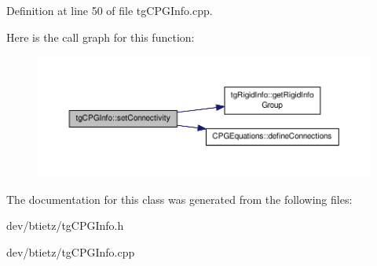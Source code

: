 Definition at line 50 of file tg\-C\-P\-G\-Info.\-cpp.



Here is the call graph for this function\-:\nopagebreak
\begin{figure}[H]
\begin{center}
\leavevmode
\includegraphics[width=350pt]{classtg_c_p_g_info_ae6196de220c88e8631b863e0d63d1d7f_cgraph}
\end{center}
\end{figure}




The documentation for this class was generated from the following files\-:\begin{DoxyCompactItemize}
\item 
dev/btietz/tg\-C\-P\-G\-Info.\-h\item 
dev/btietz/tg\-C\-P\-G\-Info.\-cpp\end{DoxyCompactItemize}
